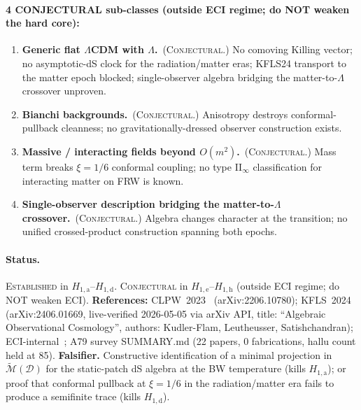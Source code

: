 \documentclass[a4paper,11pt]{article}
\theoremstyle{definition}
\theoremstyle{remark}
\begin{document}
\paragraph{4 CONJECTURAL sub-classes (outside ECI regime;
           do NOT weaken the hard core):}
\begin{enumerate}
\item[$H_{1,\mathrm{e}}$]
  \textbf{Generic flat $\Lambda$CDM with $\Lambda$.}\
  (\textsc{Conjectural.})
  No comoving Killing vector; no asymptotic-dS clock for the
  radiation/matter eras; KFLS24 transport to the matter epoch
  blocked; single-observer algebra bridging the matter-to-$\Lambda$
  crossover unproven.
\item[$H_{1,\mathrm{f}}$]
  \textbf{Bianchi backgrounds.}\ (\textsc{Conjectural.})
  Anisotropy destroys conformal-pullback cleanness;
  no gravitationally-dressed observer construction exists.
\item[$H_{1,\mathrm{g}}$]
  \textbf{Massive / interacting fields beyond $O(m^2)$.}\
  (\textsc{Conjectural.})
  Mass term breaks $\xi=1/6$ conformal coupling; no type II$_\infty$
  classification for interacting matter on FRW is known.
\item[$H_{1,\mathrm{h}}$]
  \textbf{Single-observer description bridging the matter-to-$\Lambda$
  crossover.}\ (\textsc{Conjectural.})
  Algebra changes character at the transition; no unified
  crossed-product construction spanning both epochs.
\end{enumerate}

\paragraph{Status.}
\textsc{Established} in $H_{1,\mathrm{a}}$--$H_{1,\mathrm{d}}$.
\textsc{Conjectural} in $H_{1,\mathrm{e}}$--$H_{1,\mathrm{h}}$
(outside ECI regime; do NOT weaken ECI).
\textbf{References:} CLPW~2023~\cite{CLPW23} (arXiv:2206.10780);
KFLS~2024~\cite{KFLS24} (arXiv:2406.01669, live-verified 2026-05-05
via arXiv API, title: ``Algebraic Observational Cosmology'', authors:
Kudler-Flam, Leutheusser, Satishchandran);
ECI-internal~\cite{FRWnote}; A79 survey SUMMARY.md (22 papers,
0 fabrications, hallu count held at 85).
\textbf{Falsifier.}  Constructive identification of a minimal
projection in $\widetilde{\mathcal{M}}(\mathcal{D})$ for the
static-patch dS algebra at the BW temperature (kills
$H_{1,\mathrm{a}}$); or proof that conformal pullback at
$\xi=1/6$ in the radiation/matter era fails to produce a
semifinite trace (kills $H_{1,\mathrm{d}}$).
\end{document}
